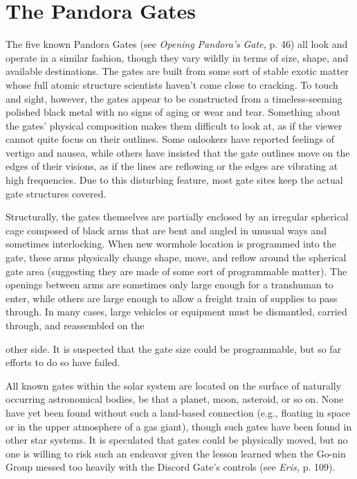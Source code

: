 \section{The Pandora Gates} 

The five known Pandora Gates (see \textit{Opening Pandora's } \textit{Gate,} p. 46) all look and operate in a similar fashion, though they vary wildly in terms of size, shape, and available destinations. The gates are built from some sort of stable exotic matter whose full atomic structure scientists haven't come close to cracking. To touch and sight, however, the gates appear to be constructed from a timeless-seeming polished black metal with no signs of aging or wear and tear. Something about the gates' physical composition makes them difficult to look at, as if the viewer cannot quite focus on their outlines. Some onlookers have reported feelings of vertigo and nausea, while others have insisted that the gate outlines move on the edges of their visions, as if the lines are reflowing or the edges are vibrating at high frequencies. Due to this disturbing feature, most gate sites keep the actual gate structures covered. 

Structurally, the gates themselves are partially enclosed by an irregular spherical cage composed of black arms that are bent and angled in unusual ways and sometimes interlocking. When new wormhole location is programmed into the gate, these arms physically change shape, move, and reflow around the spherical gate area (suggesting they are made of some sort of programmable matter). The openings between arms are sometimes only large enough for a transhuman to enter, while others are large enough to allow a freight train of supplies to pass through. In many cases, large vehicles or equipment must be dismantled, carried through, and reassembled on the 

other side. It is suspected that the gate size could be programmable, but so far efforts to do so have failed. 

All known gates within the solar system are located on the surface of naturally occurring astronomical bodies, be that a planet, moon, asteroid, or so on. None have yet been found without such a land-based connection (e.g., floating in space or in the upper atmosphere of a gas giant), though such gates have been found in other star systems. It is speculated that gates could be physically moved, but no one is willing to risk such an endeavor given the lesson learned when the Go-nin Group messed too heavily with the Discord Gate's controls (see \textit{Eris, }p. 109). 

